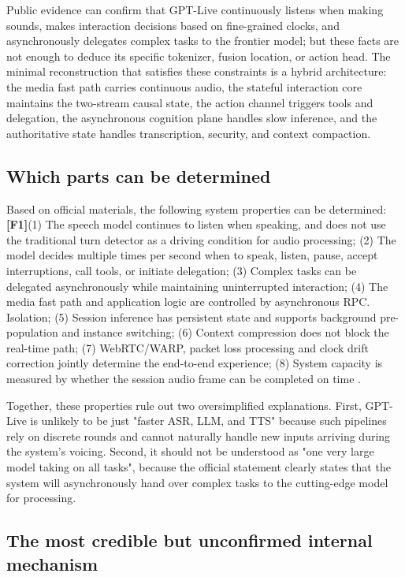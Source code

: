 \documentclass[UTF8,fontset=none,a4paper,10pt]{ctexart}
\newcommand{\FOne}{\textcolor{official}{\textbf{[F1]}}}
\begin{document}
Public evidence can confirm that GPT-Live continuously listens when making sounds, makes interaction decisions based on fine-grained clocks, and asynchronously delegates complex tasks to the frontier model; but these facts are not enough to deduce its specific tokenizer, fusion location, or action head. The minimal reconstruction that satisfies these constraints is a hybrid architecture: the media fast path carries continuous audio, the stateful interaction core maintains the two-stream causal state, the action channel triggers tools and delegation, the asynchronous cognition plane handles slow inference, and the authoritative state handles transcription, security, and context compaction.

\subsection{Which parts can be determined}

Based on official materials, the following system properties can be determined: \FOne (1) The speech model continues to listen when speaking, and does not use the traditional turn detector as a driving condition for audio processing; (2) The model decides multiple times per second when to speak, listen, pause, accept interruptions, call tools, or initiate delegation; (3) Complex tasks can be delegated asynchronously while maintaining uninterrupted interaction; (4) The media fast path and application logic are controlled by asynchronous RPC. Isolation; (5) Session inference has persistent state and supports background pre-population and instance switching; (6) Context compression does not block the real-time path; (7) WebRTC/WARP, packet loss processing and clock drift correction jointly determine the end-to-end experience; (8) System capacity is measured by whether the session audio frame can be completed on time \cite{openai2026gptlive,openai2026continuous}.

Together, these properties rule out two oversimplified explanations. First, GPT-Live is unlikely to be just "faster ASR, LLM, and TTS" because such pipelines rely on discrete rounds and cannot naturally handle new inputs arriving during the system's voicing. Second, it should not be understood as "one very large model taking on all tasks", because the official statement clearly states that the system will asynchronously hand over complex tasks to the cutting-edge model for processing.

\subsection{The most credible but unconfirmed internal mechanism}
\end{document}
